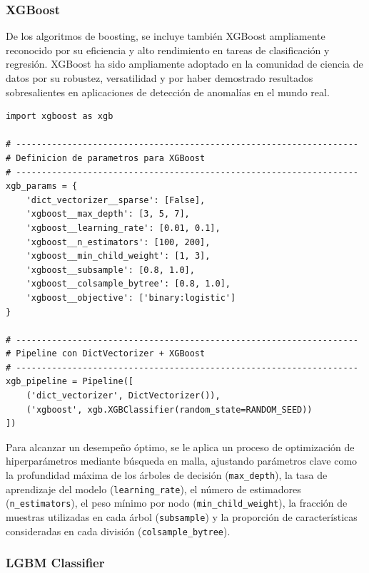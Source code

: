 \documentclass[11pt,a4paper,spanish]{book}
\numberwithin{equation}{chapter}
\numberwithin{figure}{chapter}
\begin{document}
\subsubsection{XGBoost}

De los algoritmos de boosting, se incluye también XGBoost ampliamente reconocido por su 
eficiencia y alto rendimiento en tareas de clasificación y regresión. XGBoost ha sido 
ampliamente adoptado en la comunidad de ciencia de datos por su robustez, versatilidad y 
por haber demostrado resultados sobresalientes en aplicaciones de detección de anomalías 
en el mundo real.


\vspace{5mm}
\begin{lstlisting}
import xgboost as xgb

# -------------------------------------------------------------------
# Definicion de parametros para XGBoost
# -------------------------------------------------------------------
xgb_params = {
    'dict_vectorizer__sparse': [False],
    'xgboost__max_depth': [3, 5, 7],
    'xgboost__learning_rate': [0.01, 0.1],
    'xgboost__n_estimators': [100, 200],
    'xgboost__min_child_weight': [1, 3],
    'xgboost__subsample': [0.8, 1.0],
    'xgboost__colsample_bytree': [0.8, 1.0],
    'xgboost__objective': ['binary:logistic']
}

# -------------------------------------------------------------------
# Pipeline con DictVectorizer + XGBoost
# -------------------------------------------------------------------
xgb_pipeline = Pipeline([
    ('dict_vectorizer', DictVectorizer()),
    ('xgboost', xgb.XGBClassifier(random_state=RANDOM_SEED))
])
\end{lstlisting}

Para alcanzar un desempeño óptimo, se le aplica un proceso de optimización de 
hiperparámetros mediante búsqueda en malla, ajustando parámetros clave como la 
profundidad máxima de los árboles de decisión (\lstinline|max_depth|), la tasa de 
aprendizaje del modelo (\lstinline|learning_rate|), el número de estimadores 
(\lstinline|n_estimators|), el peso mínimo por nodo (\lstinline|min_child_weight|), la 
fracción de muestras utilizadas en cada árbol (\lstinline|subsample|) y la proporción de 
características consideradas en cada división (\lstinline|colsample_bytree|). 


\subsubsection{LGBM Classifier}
\end{document}
